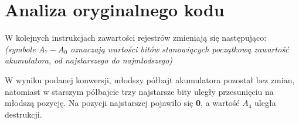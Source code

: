 \documentclass[a4paper,12pt]{extarticle}  %
\begin{document}
\section{Analiza oryginalnego kodu}

W kolejnych instrukcjach zawartości rejestrów zmieniają się następująco:\\
\emph{(symbole $A_7-A_0$ oznaczają wartości bitów stanowiących początkową zawartość akumulatora, od najstarszego do najmłodszego)}

\begin{table}[H]
	\centering
\end{table}
W wyniku podanej konwersji, młodszy półbajt akumulatora pozostał bez zmian, natomiast w starszym półbajcie trzy najstarsze bity uległy przesunięciu na młodszą pozycję.
Na pozycji najstarszej pojawiło się \textbf{0}, a wartość \textbf{$A_4$} uległa destrukcji.
\clearpage
\end{document}
